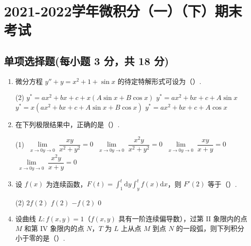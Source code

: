 \documentclass[../Main.tex]{subfiles}
\begin{document}
\chapter{2021-2022学年微积分（一）（下）期末考试}

\section{单项选择题(每小题 3 分，共 18 分)}
\begin{enumerate}
    \item 微分方程 \( y'' + y = x^2 + 1 + \sin x \) 的待定特解形式可设为（\qquad）.

          \begin{tasks}[label=\textbf{\Alph*.}, label-width=1.5em, column-sep=1em](2)
              \task \( y^* = ax^2 + bx + c + x(A\sin x + B\cos x) \)
              \task \( y^* = ax^2 + bx + c + A\sin x \)
              \task \( y^* = x(ax^2 + bx + c + A\sin x + B\cos x) \)
              \task \( y^* = ax^2 + bx + c + A\cos x \)
          \end{tasks}

    \item 在下列极限结果中，正确的是（\qquad）.

          \begin{tasks}[label=\textbf{\Alph*.}, label-width=1.5em, column-sep=1em](1)
              \task \( \lim\limits_{\substack{x \to 0 y \to 0}} \dfrac{xy}{x^2 + y^2} = 0 \)
              \task \( \lim\limits_{\substack{x \to 0 y \to 0}} \dfrac{x^2 y}{x^2 + y^2} = 0 \)
              \task \( \lim\limits_{\substack{x \to 0 y \to 0}} \dfrac{xy}{x + y} = 0 \)
              \task \( \lim\limits_{\substack{x \to 0 y \to 0}} \dfrac{x^2 y}{x + y} = 0 \)
          \end{tasks}

    \item 设 \( f(x) \) 为连续函数，\( F(t) = \displaystyle \int_1^t \mathrm{d}y \displaystyle \int_y^t f(x) \mathrm{d}x \)，则 \( F'(2) \) 等于（\qquad）.

          \begin{tasks}[label=\textbf{\Alph*.}, label-width=1.5em, column-sep=1em](2)
              \task \( 2f(2) \)
              \task \( f(2) \)
              \task \( -f(2) \)
              \task \( 0 \)
          \end{tasks}

    \item 设曲线 \( L: f(x, y) = 1 \)（\( f(x, y) \) 具有一阶连续偏导数），过第 II 象限内的点 \( M \) 和第 IV 象限内的点 \( N \)，\( T \) 为 \( L \) 上从点 \( M \) 到点 \( N \) 的一段弧，则下列积分小于零的是（\qquad）.


\end{enumerate}
\end{document}
